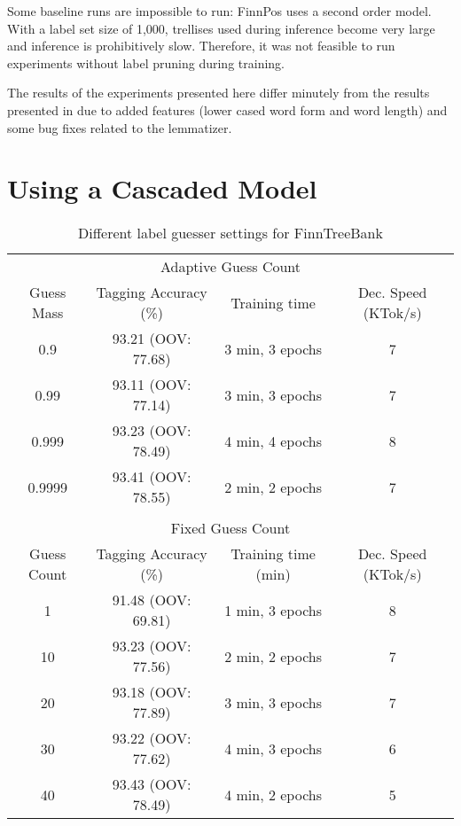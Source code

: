Some baseline runs are impossible to run: FinnPos uses a second order
model. With a label set size of 1,000, trellises used during inference
become very large and inference is prohibitively slow. Therefore, it
was not feasible to run experiments without label pruning during
training.

The results of the experiments presented here differ minutely from the
results presented in \cite{Silfverberg2015} due to added features
(lower cased word form and word length) and some bug fixes related to
the lemmatizer.

\section{Using a Cascaded Model}

\begin{table}[htb!]
\begin{center}
\begin{tabular}{cccc}
\multicolumn{4}{c}{Adaptive Guess Count}\\
Guess Mass & Tagging Accuracy (\%) & Training time & Dec. Speed (KTok/s)\\
\hline
0.9        & 93.21 (OOV: 77.68) & 3 min, 3 epochs &   7          \\
0.99       & 93.11 (OOV: 77.14) & 3 min, 3 epochs & 7            \\
0.999      & 93.23 (OOV: 78.49) & 4 min, 4 epochs            & 8            \\
0.9999      & 93.41 (OOV: 78.55) & 2 min, 2 epochs            & 7            \\
           &                  &               &               \\
\multicolumn{4}{c}{Fixed Guess Count}\\
Guess Count & Tagging Accuracy (\%) & Training time (min) & Dec. Speed (KTok/s) \\
\hline
1        & 91.48 (OOV: 69.81)           & 1 min, 3 epochs            & 8            \\
10       & 93.23 (OOV: 77.56)           & 2 min, 2 epochs            & 7            \\
20       & 93.18 (OOV: 77.89)           & 3 min, 3 epochs            & 7            \\
30       & 93.22 (OOV: 77.62)           & 4 min, 3 epochs            & 6            \\
40       & 93.43 (OOV: 78.49)           & 4 min, 2 epochs            & 5            \\
\end{tabular}
\caption{Different label guesser settings for FinnTreeBank}
\end{center}
\end{table}


